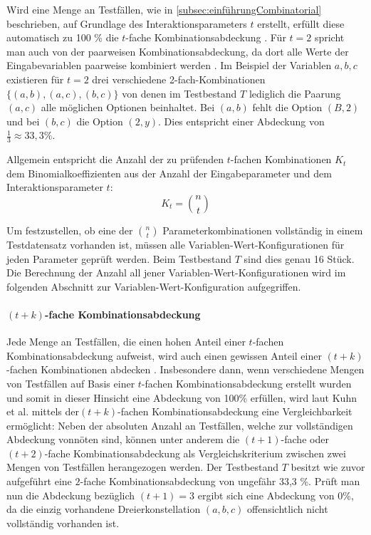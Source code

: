Wird eine Menge an Testfällen, wie in \autoref{subsec:einführungCombinatorial} beschrieben, auf Grundlage des Interaktionsparameters $t$ erstellt, erfüllt diese automatisch zu 100 \% die $t$-fache Kombinationsabdeckung \cite{kuhn2010practical}. Für $t = 2$ spricht man auch von der paarweisen Kombinationsabdeckung, da dort alle Werte der Eingabevariablen paarweise kombiniert werden \cite{kuhn2010practical}. Im Beispiel der Variablen $a,b,c$ existieren für $t = 2$ drei verschiedene 2-fach-Kombinationen $\{(a,b), (a,c), (b,c)\}$ von denen im Testbestand $T$ lediglich die Paarung $(a,c)$ alle möglichen Optionen beinhaltet. Bei $(a,b)$ fehlt die Option $(B,2)$ und bei $(b,c)$ die Option $(2,y)$. Dies entspricht einer Abdeckung von $\frac{1}{3} \approx 33,3 \%$. 

Allgemein entspricht die Anzahl der zu prüfenden $t$-fachen Kombinationen $K_t$ dem Binomialkoeffizienten aus der Anzahl der Eingabeparameter und dem Interaktionsparameter $t$:
\[
K_t = \binom{n}{t}
\]

Um festzustellen, ob eine der $\binom{n}{t}$ Parameterkombinationen vollständig in einem Testdatensatz vorhanden ist, müssen alle Variablen-Wert-Konfigurationen für jeden Parameter geprüft werden. Beim Testbestand $T$ sind dies genau 16 Stück. Die Berechnung der Anzahl all jener Variablen-Wert-Konfigurationen wird im folgenden Abschnitt zur Variablen-Wert-Konfiguration aufgegriffen.

\paragraph{$(t+k)$-fache Kombinationsabdeckung}

Jede Menge an Testfällen, die einen hohen Anteil einer $t$-fachen Kombinationsabdeckung aufweist, wird auch einen gewissen Anteil einer $(t+k)$-fachen Kombinationen abdecken \cite{kuhn2010practical}. Insbesondere dann, wenn verschiedene Mengen von Testfällen auf Basis einer $t$-fachen Kombinationsabdeckung erstellt wurden und somit in dieser Hinsicht eine Abdeckung von 100\% erfüllen, wird laut Kuhn et al. \cite{kuhn2010practical} mittels der$(t+k)$-fachen Kombinationsabdeckung eine Vergleichbarkeit ermöglicht: Neben der absoluten Anzahl an Testfällen, welche zur vollständigen Abdeckung vonnöten sind, können unter anderem die $(t+1)$-fache oder $(t+2)$-fache Kombinationsabdeckung als Vergleichskriterium zwischen zwei Mengen von Testfällen herangezogen werden. Der Testbestand $T$ besitzt wie zuvor aufgeführt eine $2$-fache Kombinationsabdeckung von ungefähr 33,3 \%. Prüft man nun die Abdeckung bezüglich $(t+1) = 3$ ergibt sich eine Abdeckung von 0\%, da die einzig vorhandene Dreierkonstellation $(a,b,c)$ offensichtlich nicht vollständig vorhanden ist.  

